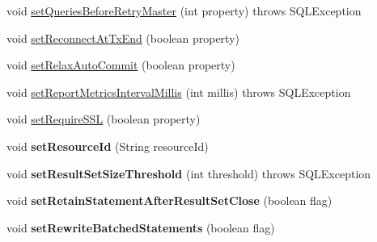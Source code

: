 \begin{DoxyCompactItemize}
\item 
void \mbox{\hyperlink{classcom_1_1mysql_1_1jdbc_1_1jdbc2_1_1optional_1_1_connection_wrapper_a3a5da08b543633c1643a07d41696b7c7}{set\+Queries\+Before\+Retry\+Master}} (int property)  throws S\+Q\+L\+Exception 
\item 
void \mbox{\hyperlink{classcom_1_1mysql_1_1jdbc_1_1jdbc2_1_1optional_1_1_connection_wrapper_a54004b1b90728b482c4bb555a76dbb29}{set\+Reconnect\+At\+Tx\+End}} (boolean property)
\item 
void \mbox{\hyperlink{classcom_1_1mysql_1_1jdbc_1_1jdbc2_1_1optional_1_1_connection_wrapper_af338a10a5b9e993703c9e21810e74b21}{set\+Relax\+Auto\+Commit}} (boolean property)
\item 
void \mbox{\hyperlink{classcom_1_1mysql_1_1jdbc_1_1jdbc2_1_1optional_1_1_connection_wrapper_ac30ff270089a0b4903332b4b6e3b2f2d}{set\+Report\+Metrics\+Interval\+Millis}} (int millis)  throws S\+Q\+L\+Exception 
\item 
void \mbox{\hyperlink{classcom_1_1mysql_1_1jdbc_1_1jdbc2_1_1optional_1_1_connection_wrapper_a7aced035eee3e3d7402a549b608e391b}{set\+Require\+S\+SL}} (boolean property)
\item 
\mbox{\label{classcom_1_1mysql_1_1jdbc_1_1jdbc2_1_1optional_1_1_connection_wrapper_a46adc7d8c0a22941fb346604baf675f4}} 
void {\bfseries set\+Resource\+Id} (String resource\+Id)
\item 
\mbox{\label{classcom_1_1mysql_1_1jdbc_1_1jdbc2_1_1optional_1_1_connection_wrapper_a4d6697dcb456efffee760964f24990b5}} 
void {\bfseries set\+Result\+Set\+Size\+Threshold} (int threshold)  throws S\+Q\+L\+Exception 
\item 
\mbox{\label{classcom_1_1mysql_1_1jdbc_1_1jdbc2_1_1optional_1_1_connection_wrapper_a3e2df3032d97833677fcc0539ca43f3e}} 
void {\bfseries set\+Retain\+Statement\+After\+Result\+Set\+Close} (boolean flag)
\item 
\mbox{\label{classcom_1_1mysql_1_1jdbc_1_1jdbc2_1_1optional_1_1_connection_wrapper_a9ffc9cc6b9d9a1e109a6c245496402b7}} 
void {\bfseries set\+Rewrite\+Batched\+Statements} (boolean flag)

\end{DoxyCompactItemize}
